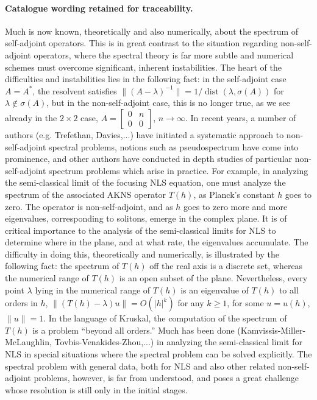 \documentclass[11pt]{article}
\begin{document}
\paragraph{Catalogue wording retained for traceability.}
Much is now known, theoretically and also numerically, about the spectrum of self-adjoint operators. This is in great contrast to the situation regarding non-self-adjoint operators, where the spectral theory is far more subtle and numerical schemes must overcome significant, inherent instabilities. The heart of the difficulties and instabilities lies in the following fact: in the self-adjoint case $A=A^*$, the resolvent satisfies $\|(A-\lambda)^{-1}\|=1/\operatorname{dist}(\lambda,\sigma(A))$ for $\lambda\notin\sigma(A)$, but in the non-self-adjoint case, this is no longer true, as we see already in the $2\times2$ case, $A=\begin{bmatrix}0&n\\0&0\end{bmatrix}$, $n\to\infty$. In recent years, a number of authors (e.g. Trefethan, Davies,...) have initiated a systematic approach to non-self-adjoint spectral problems, notions such as pseudospectrum have come into prominence, and other authors have conducted in depth studies of particular non-self-adjoint spectrum problems which arise in practice. For example, in analyzing the semi-classical limit of the focusing NLS equation, one must analyze the spectrum of the associated AKNS operator $T(h)$, as Planck's constant $h$ goes to zero. The operator is non-self-adjoint, and as $h$ goes to zero more and more eigenvalues, corresponding to solitons, emerge in the complex plane. It is of critical importance to the analysis of the semi-classical limits for NLS to determine where in the plane, and at what rate, the eigenvalues accumulate. The difficulty in doing this, theoretically and numerically, is illustrated by the following fact: the spectrum of $T(h)$ off the real axis is a discrete set, whereas the numerical range of $T(h)$ is an open subset of the plane. Nevertheless, every point $\lambda$ lying in the numerical range of $T(h)$ is an eigenvalue of $T(h)$ to all orders in $h$, $\|(T(h)-\lambda)u\|=O(|h|^k)$ for any $k\geq 1$, for some $u=u(h)$, $\|u\|=1$. In the language of Kruskal, the computation of the spectrum of $T(h)$ is a problem ``beyond all orders.'' Much has been done (Kamvissis-Miller-McLaughlin, Tovbis-Venakides-Zhou,...) in analyzing the semi-classical limit for NLS in special situations where the spectral problem can be solved explicitly. The spectral problem with general data, both for NLS and also other related non-self-adjoint problems, however, is far from understood, and poses a great challenge whose resolution is still only in the initial stages.
\end{document}
